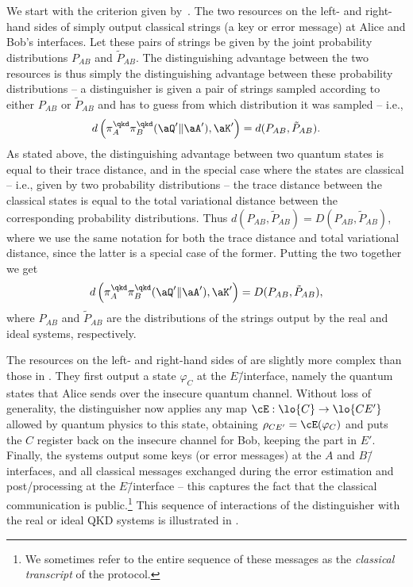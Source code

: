 We start with the criterion given by~. The two resources on the left- and right-hand sides of  simply output classical strings (a key or error message) at Alice and Bob's interfaces. Let these pairs of strings be given by the joint probability distributions $P_{AB}$ and $\tilde{P}_{AB}$. The distinguishing advantage between the two resources is thus simply the distinguishing advantage between these probability distributions \--- a distinguisher is given a pair of strings sampled according to either $P_{AB}$ or $\tilde{P}_{AB}$ and has to guess from which distribution it was sampled \--- i.e., 
\[ 
  d\left( \pi_A^{\qkd}\pi_B^{\qkd}(\aQ' \| \aA'), \aK' \right) = d(P_{AB},\tilde{P}_{AB}).
   \] 
 As stated above, the distinguishing advantage between two quantum states is equal to their trace distance, and in the special case where the states are classical \--- i.e., given by two probability distributions \--- the trace distance between the classical states is equal to the total variational distance between the corresponding probability distributions. Thus $d(P_{AB},\tilde{P}_{AB})= D(P_{AB},\tilde{P}_{AB})$, where we use the same notation for both the trace distance and total variational distance, since the latter is a special case of the former. Putting the two together we get
\[ 
d\left( \pi_A^{\qkd}\pi_B^{\qkd}(\aQ' \| \aA')
  , \aK' \right) = D(P_{AB},\tilde{P}_{AB}),
 \] 
  where $P_{AB}$ and $\tilde{P}_{AB}$ are the distributions of the strings output by the real and ideal systems, respectively.

  The resources on the left- and right-hand sides of
   are slightly more complex than those in
  . They first output a state $\varphi_C$ at
  the $E$\=/interface, namely the quantum states that Alice sends over
  the insecure quantum channel. Without loss of generality, the
  distinguisher now applies any map $\cE : \lo{C} \to \lo{CE'}$
  allowed by quantum physics to this state, obtaining
  $\rho_{CE'} = \cE(\varphi_C)$ and puts the $C$ register back on the
  insecure channel for Bob, keeping the part in $E'$. Finally, the
  systems output some keys (or error messages) at the $A$ and
  $B$\=/interfaces, and all classical messages exchanged during the
  error estimation and post\-/processing at the $E$\=/interface \---
  this captures the fact that the classical communication is
  public.\footnote{We sometimes refer to the entire sequence of these
    messages as the \emph{classical transcript} of the protocol.} This
  sequence of interactions of the distinguisher with the real or ideal
  QKD systems is illustrated in .

